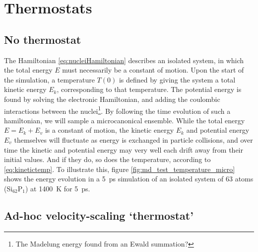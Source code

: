 \documentclass[11pt,bibliography=totoc,index=totoc]{scrbook}   %
\begin{document}
\section{Thermostats}
%

%
\subsection{No thermostat}
%

The Hamiltonian \eqref{eq:nucleiHamiltonian} describes an isolated system, in which the total energy $E$ must necessarily be a constant of motion.
Upon the start of the simulation, a temperature $T(0)$ is defined by giving the system a total kinetic energy $E_k$, corresponding to that temperature. The potential energy is found by solving the electronic Hamiltonian, and adding the coulombic interactions between the nuclei\footnote{The Madelung energy found from an Ewald summation?}.
By following the time evolution of such a hamiltonian, we will sample a microcanonical ensemble. 
While the total energy $E=E_k+E_v$ is a constant of motion, the kinetic energy $E_k$ and potential energy $E_v$ themselves will fluctuate as energy is exchanged in particle collisions, and over time the kinetic and potential energy may very well each drift away from their initial values. 
And if they do, so does the temperature, according to \eqref{eq:kinetictemp}. 
To illustrate this, figure \ref{fig:md_test_temperature_micro} shows the energy evolution in a 5~ps simulation of an isolated system of 63 atoms (Si$_{62}$P$_1$) at 1400~K for 5~ps.

%
\subsection{Ad-hoc velocity-scaling `thermostat'}
%
\end{document}
